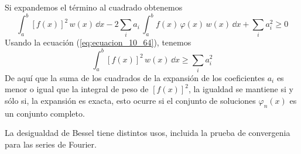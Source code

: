 Si expandemos el término al cuadrado obtenemos
\begin{equation}
\int_{a}^{b} [ f(x) ]^{2} \, w(x) \, \dd{x} - 2 \sum_{i} a_{i} \, \int_{a}^{b} f(x) \, \varphi (x) \, w(x) \, \dd{x} + \sum_{i} a_{i}^{2} \geq 0
\label{eq:ecuacion_10_72}
\end{equation}
Usando la ecuación (\ref{eq:ecuacion_10_64}), tenemos
\begin{equation}
\int_{a}^{b} [f(x)]^{2} \, w(x) \, \dd{x} \geq \sum_{i} a_{i}^{2}
\label{eq:ecuacion_10_73}
\end{equation}
De aquí que la suma de los cuadrados de la expansión de los coeficientes $a_{i}$ es menor o igual que la integral de peso de $[f(x)]^{2}$, la igualdad se mantiene si y sólo si, la expansión es exacta, esto ocurre si el conjunto de soluciones $\varphi_{n}(x)$ es un conjunto completo.
\par
La desigualdad de Bessel tiene distintos usos, incluida la prueba de convergenia para las series de Fourier.
